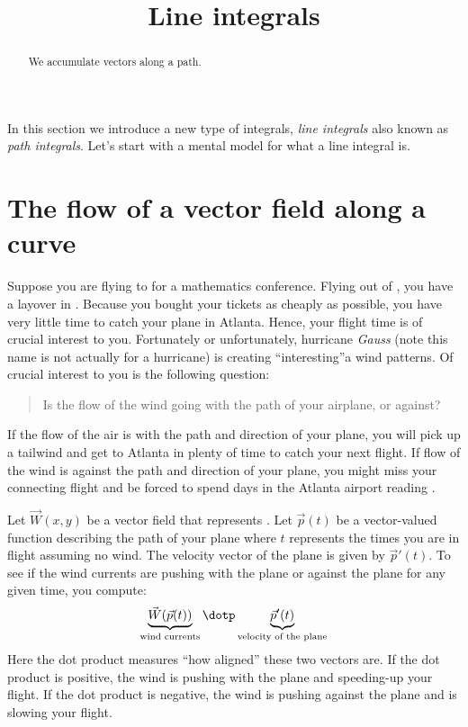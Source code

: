 \documentclass{ximera}
\title[Dig-In:]{Line integrals}
\begin{document}
\begin{abstract}
We accumulate vectors along a path.
\end{abstract}
\maketitle

In this section we introduce a new type of integrals, \textit{line
  integrals} also known as \textit{path integrals}. Let's start with a
mental model for what a line integral is.

\section{The flow of a vector field along a curve}

Suppose you are flying to  for a mathematics
conference. Flying out of , you have a layover in . Because
you bought your tickets as cheaply as possible, you have very little
time to catch your plane in Atlanta. Hence, your flight time is of crucial
interest to you. Fortunately or unfortunately, hurricane
\textit{Gauss} (note this name is not actually
for a hurricane) is creating ``interesting''a wind patterns. Of crucial
interest to you is the following question:
\begin{quote}
  Is the flow of the wind going with the path of your airplane, or
  against? 
\end{quote}
If the flow of the air is with the path and direction of your plane,
you will pick up a tailwind and get to Atlanta in plenty of time to
catch your next flight. If flow of the wind is against the path and
direction of your plane, you might miss your connecting flight and be
forced to spend days in the Atlanta airport reading .

Let $\vec{W}(x,y)$ be a vector field that represents . Let $\vec{p}(t)$ be a
vector-valued function describing the path of your plane where $t$
represents the times you are in flight assuming no wind.  The velocity
vector of the plane is given by $\vec{p}'(t)$. To see if the wind
currents are pushing with the plane or against the plane for any given
time, you compute:
\[
\underbrace{\vec{W}(\vec{p}(t))}_{\text{wind currents}}\dotp \underbrace{\vec{p}'(t)}_{\text{velocity of the plane}}
\]
Here the dot product measures ``how aligned'' these two vectors are.
If the dot product is positive, the wind is pushing with the plane and
speeding-up your flight. If the dot product is negative, the wind is
pushing against the plane and is slowing your flight.
\end{document}
